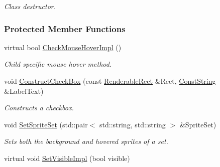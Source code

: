 \begin{DoxyCompactItemize}
\begin{DoxyCompactList}\small\item\em Class destructor. \item\end{DoxyCompactList}\end{DoxyCompactItemize}
\subsubsection*{Protected Member Functions}
\begin{DoxyCompactItemize}
\item 
\hypertarget{classMezzanine_1_1UI_1_1CheckBox_a6a9f31c4bd0915b7405c10b8bfe6710a}{
virtual bool \hyperlink{classMezzanine_1_1UI_1_1CheckBox_a6a9f31c4bd0915b7405c10b8bfe6710a}{CheckMouseHoverImpl} ()}
\label{classMezzanine_1_1UI_1_1CheckBox_a6a9f31c4bd0915b7405c10b8bfe6710a}

\begin{DoxyCompactList}\small\item\em Child specific mouse hover method. \item\end{DoxyCompactList}\item 
\hypertarget{classMezzanine_1_1UI_1_1CheckBox_a841ed282181848150b56aec13319d9a9}{
void \hyperlink{classMezzanine_1_1UI_1_1CheckBox_a841ed282181848150b56aec13319d9a9}{ConstructCheckBox} (const \hyperlink{structMezzanine_1_1UI_1_1RenderableRect}{RenderableRect} \&Rect, \hyperlink{namespaceMezzanine_a63cd699ac54b73953f35ec9cfc05e506}{ConstString} \&LabelText)}
\label{classMezzanine_1_1UI_1_1CheckBox_a841ed282181848150b56aec13319d9a9}

\begin{DoxyCompactList}\small\item\em Constructs a checkbox. \item\end{DoxyCompactList}\item 
\hypertarget{classMezzanine_1_1UI_1_1CheckBox_a8a32068338e6fedcf5d53d3eae5d909a}{
void \hyperlink{classMezzanine_1_1UI_1_1CheckBox_a8a32068338e6fedcf5d53d3eae5d909a}{SetSpriteSet} (std::pair$<$ std::string, std::string $>$ \&SpriteSet)}
\label{classMezzanine_1_1UI_1_1CheckBox_a8a32068338e6fedcf5d53d3eae5d909a}

\begin{DoxyCompactList}\small\item\em Sets both the background and hovered sprites of a set. \item\end{DoxyCompactList}\item 
\hypertarget{classMezzanine_1_1UI_1_1CheckBox_a60b8cce148408b94f7ec3942b2ddcedd}{
virtual void \hyperlink{classMezzanine_1_1UI_1_1CheckBox_a60b8cce148408b94f7ec3942b2ddcedd}{SetVisibleImpl} (bool visible)}
\label{classMezzanine_1_1UI_1_1CheckBox_a60b8cce148408b94f7ec3942b2ddcedd}


\end{DoxyCompactItemize}
